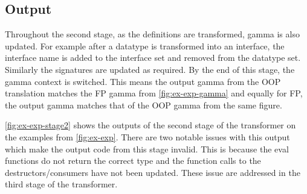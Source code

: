 \documentclass[ oneside,%
                    author={James Elgar},
                    degree={MEng},
                     title={Bidirectional transformer between functional and \\ object-oriented programming in Rust},
                  subtitle={}]{dissertation}
\begin{document}
\subsection{Output}

Throughout the second stage, as the definitions are transformed, gamma is also updated. For example after a datatype is transformed into an interface, the interface name is added to the interface set and removed from the datatype set. Similarly the signatures are updated as required. By the end of this stage, the gamma context is switched. This means the output gamma from the OOP translation matches the FP gamma from \autoref{fig:ex-exp-gamma} and equally for FP, the output gamma matches that of the OOP gamma from the same figure.

\autoref{fig:ex-exp-stage2} shows the outputs of the second stage of the transformer on the examples from \autoref{fig:ex-exp}. There are two notable issues with this output which make the output code from this stage invalid. This is because the eval functions do not return the correct type and the function calls to the destructors/consumers have not been updated. These issue are addressed in the third stage of the transformer.




\end{document}
